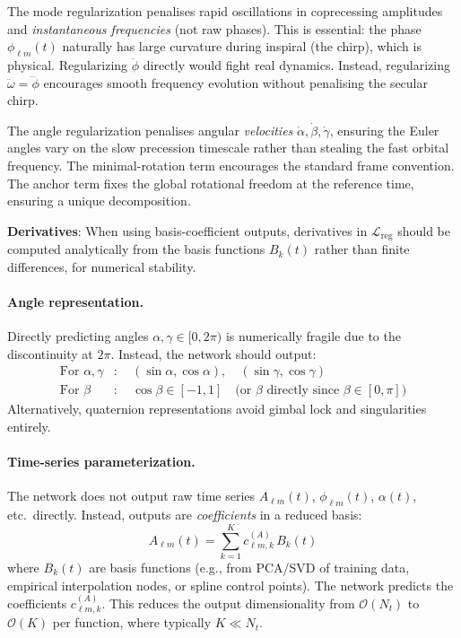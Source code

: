 \documentclass[11pt,a4paper]{article}
\begin{document}
The mode regularization penalises rapid oscillations in coprecessing amplitudes and \emph{instantaneous frequencies} (not raw phases). This is essential: the phase $\phi_{\ell m}(t)$ naturally has large curvature during inspiral (the chirp), which is physical. Regularizing $\ddot{\phi}$ directly would fight real dynamics. Instead, regularizing $\ddot{\omega} = \dddot{\phi}$ encourages smooth frequency evolution without penalising the secular chirp.

The angle regularization penalises angular \emph{velocities} $\dot{\alpha}, \dot{\beta}, \dot{\gamma}$, ensuring the Euler angles vary on the slow precession timescale rather than stealing the fast orbital frequency. The minimal-rotation term encourages the standard frame convention. The anchor term fixes the global rotational freedom at the reference time, ensuring a unique decomposition.

\textbf{Derivatives}: When using basis-coefficient outputs, derivatives in $\mathcal{L}_{\text{reg}}$ should be computed analytically from the basis functions $B_k(t)$ rather than finite differences, for numerical stability.

\paragraph{Angle representation.}
Directly predicting angles $\alpha, \gamma \in [0, 2\pi)$ is numerically fragile due to the discontinuity at $2\pi$. Instead, the network should output:
\begin{align}
    \text{For } \alpha, \gamma&: \quad (\sin\alpha, \cos\alpha), \quad (\sin\gamma, \cos\gamma) \\
    \text{For } \beta&: \quad \cos\beta \in [-1, 1] \quad \text{(or } \beta \text{ directly since } \beta \in [0, \pi])
\end{align}
Alternatively, quaternion representations avoid gimbal lock and singularities entirely.

\paragraph{Time-series parameterization.}
The network does not output raw time series $A_{\ell m}(t)$, $\phi_{\ell m}(t)$, $\alpha(t)$, etc.\ directly. Instead, outputs are \emph{coefficients} in a reduced basis:
\begin{equation}
    A_{\ell m}(t) = \sum_{k=1}^{K} c^{(A)}_{\ell m, k} \, B_k(t)
\end{equation}
where $B_k(t)$ are basis functions (e.g., from PCA/SVD of training data, empirical interpolation nodes, or spline control points). The network predicts the coefficients $c^{(A)}_{\ell m, k}$. This reduces the output dimensionality from $\mathcal{O}(N_t)$ to $\mathcal{O}(K)$ per function, where typically $K \ll N_t$.
\end{document}
